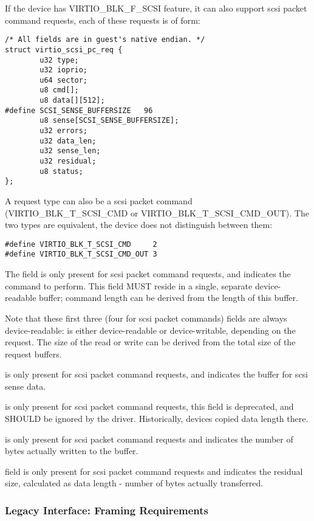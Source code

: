 If the device has VIRTIO_BLK_F_SCSI feature, it can also support
scsi packet command requests, each of these requests is of form:

\begin{lstlisting}
/* All fields are in guest's native endian. */
struct virtio_scsi_pc_req {
        u32 type;
        u32 ioprio;
        u64 sector;
        u8 cmd[];
        u8 data[][512];
#define SCSI_SENSE_BUFFERSIZE   96
        u8 sense[SCSI_SENSE_BUFFERSIZE];
        u32 errors;
        u32 data_len;
        u32 sense_len;
        u32 residual;
        u8 status;
};
\end{lstlisting}

A request type can also be a scsi packet command (VIRTIO_BLK_T_SCSI_CMD or
VIRTIO_BLK_T_SCSI_CMD_OUT).  The two types are equivalent, the device
does not distinguish between them:

\begin{lstlisting}
#define VIRTIO_BLK_T_SCSI_CMD     2
#define VIRTIO_BLK_T_SCSI_CMD_OUT 3
\end{lstlisting}

The  field is only present for scsi packet command requests,
and indicates the command to perform. This field MUST reside in a
single, separate device-readable buffer; command length can be derived
from the length of this buffer.

Note that these first three (four for scsi packet commands)
fields are always device-readable:  is either device-readable
or device-writable, depending on the request. The size of the read or
write can be derived from the total size of the request buffers.

 is only present for scsi packet command requests,
and indicates the buffer for scsi sense data.

 is only present for scsi packet command
requests, this field is deprecated, and SHOULD be ignored by the
driver. Historically, devices copied data length there.

 is only present for scsi packet command
requests and indicates the number of bytes actually written to
the  buffer.

 field is only present for scsi packet command
requests and indicates the residual size, calculated as data
length - number of bytes actually transferred.

\subsubsection{Legacy Interface: Framing Requirements}\label{sec:Device
Types / Block Device / Legacy Interface: Framing Requirements}

